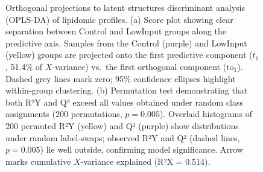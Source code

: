 \documentclass[10pt,letterpaper]{article}
\begin{document}
\begin{figure}[htbp]
  \caption{Orthogonal projections to latent structures discriminant analysis (OPLS-DA) of lipidomic profiles. (a) Score plot showing clear separation between Control and LowInput groups along the predictive axis. Samples from the Control (purple) and LowInput (yellow) groups are projected onto the first predictive component ($t_1$, 51.4\% of $X$-variance) vs.\ the first orthogonal component ($\mathrm{to}_1$). Dashed grey lines mark zero; 95\% confidence ellipses highlight within-group clustering. (b) Permutation test demonstrating that both R²Y and Q² exceed all values obtained under random class assignments (200 permutations, $p=0.005$). Overlaid histograms of 200 permuted R²Y (yellow) and Q² (purple) show distributions under random label‐swaps; observed R²Y and Q² (dashed lines, $p=0.005$) lie well outside, confirming model significance. Arrow marks cumulative $X$-variance explained (R²X = 0.514).}
  \label{fig:OPLS}
\end{figure}
\end{document}
